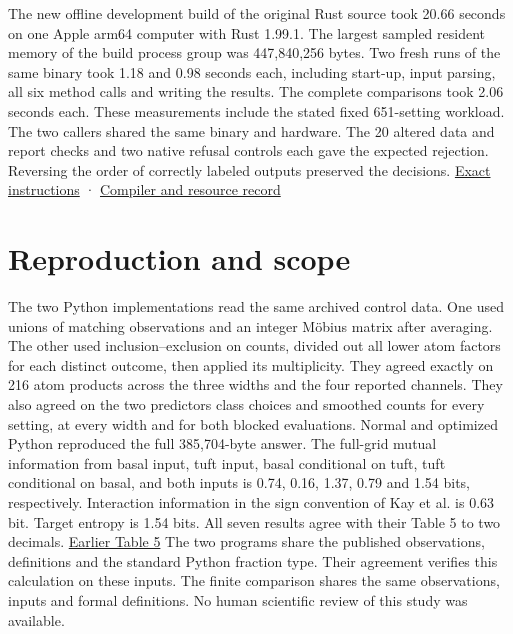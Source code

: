 The new offline development build of the original Rust source took 20.66 seconds on one Apple arm64 computer with Rust 1.99.1. The largest sampled resident memory of the build process group was 447,840,256 bytes. Two fresh runs of the same binary took 1.18 and 0.98 seconds each, including start-up, input parsing, all six method calls and writing the results. The complete comparisons took 2.06 seconds each. These measurements include the stated fixed 651-setting workload. The two callers shared the same binary and hardware. The 20 altered data and report checks and two native refusal controls each gave the expected rejection. Reversing the order of correctly labeled outputs preserved the decisions. \href{https://github.com/sepahead/pid-rs/blob/main/audit/research/dendritic-stimulus-resolution/rust-comparison/README.md}{Exact instructions} · \href{https://github.com/sepahead/pid-rs/blob/main/audit/research/dendritic-stimulus-resolution/rust-comparison/resources.json}{Compiler and resource record}

\clearpage

\section{Reproduction and scope}\label{reproduction-and-scope}

The two Python implementations read the same archived control data. One used unions of matching observations and an integer Möbius matrix after averaging. The other used inclusion--exclusion on counts, divided out all lower atom factors for each distinct outcome, then applied its multiplicity. They agreed exactly on 216 atom products across the three widths and the four reported channels. They also agreed on the two predictors\textquotesingle{} class choices and smoothed counts for every setting, at every width and for both blocked evaluations. Normal and optimized Python reproduced the full 385,704-byte answer. The full-grid mutual information from basal input, tuft input, basal conditional on tuft, tuft conditional on basal, and both inputs is 0.74, 0.16, 1.37, 0.79 and 1.54 bits, respectively. Interaction information in the sign convention of Kay et al. is 0.63 bit. Target entropy is 1.54 bits. All seven results agree with their Table 5 to two decimals. \href{https://doi.org/10.3390/e24081021}{Earlier Table 5} The two programs share the published observations, definitions and the standard Python fraction type. Their agreement verifies this calculation on these inputs. The finite comparison shares the same observations, inputs and formal definitions. No human scientific review of this study was available.

